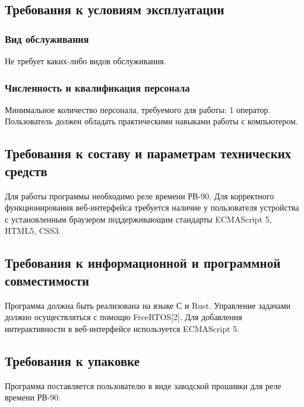 \subsection{Требования к условиям эксплуатации}
\subsubsection{Вид обслуживания}
Не требует каких-либо видов обслуживания.

\subsubsection{Численность и квалификация персонала}
Минимальное количество персонала, требуемого для работы: 1 оператор. Пользователь должен обладать практическими навыками работы с компьютером.

\subsection{Требования к составу и параметрам технических средств}
Для работы программы необходимо реле времени РВ-90. Для корректного функционирования веб-интерфейса требуется наличие у пользователя устройства с установленным браузером поддерживающим стандарты ECMAScript 5, HTML5, CSS3.


\subsection{Требования к информационной и программной совместимости}

Программа должна быть реализована на языке С и Rust. Управление задачами должно осуществляться с помощю FreeRTOS[2]. Для добавления интерактивности в веб-интерфейсе используется ECMAScript 5.


\subsection{Требования к упаковке}
Программа поставляется пользователю в виде заводской прошивки для реле времени РВ-90. 
